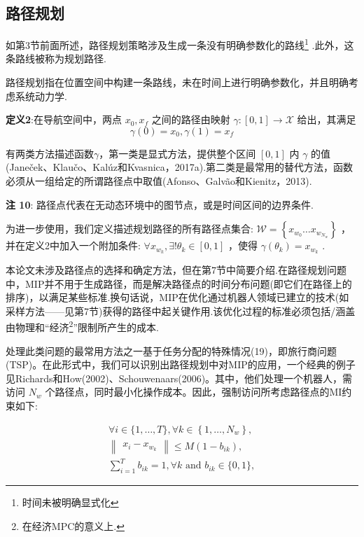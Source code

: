 \documentclass[10pt]{article}
\begin{document}
\subsection{路径规划}

如第3节前面所述，路径规划策略涉及生成一条没有明确参数化的路线\footnote{时间未被明确显式化} .此外，这条路线被称为规划路径.

路径规划指在位置空间中构建一条路线，未在时间上进行明确参数化，并且明确考虑系统动力学.

\vspace{1 em}
\noindent\textbf{定义2}:在导航空间中，两点 \({x}_{0},{x}_{f}\) 之间的路径由映射 \(\gamma  : \left\lbrack  {0,1}\right\rbrack   \rightarrow  \mathcal{X}\) 给出，其满足
\begin{equation}
\gamma \left( 0\right)  = {x}_{0},\gamma \left( 1\right)  = {x}_{f}
\end{equation}

有两类方法描述函数$\gamma$，第一类是显式方法，提供整个区间 \(\left\lbrack  {0,1}\right\rbrack\) 内 \(\gamma\) 的值(Janeček、Klaučo、Kalúz和Kvasnica，2017a).第二类是最常用的替代方法，函数必须从一组给定的所谓路径点中取值(Afonso、Galvão和Kienitz，2013).

\vspace{1 em}
\noindent\textbf{注 10}: 路径点代表在无动态环境中的图节点，或是时间区间的边界条件.
\vspace{1 em}

为进一步使用，我们定义描述规划路径的所有路径点集合: \(\mathcal{W} = \left\{  {{x}_{{w}_{0}}\ldots {x}_{{w}_{{N}_{w}}}}\right\}\) ，并在定义2中加入一个附加条件: \(\forall {x}_{{w}_{k}},\exists !{\theta }_{k} \in  \left\lbrack  {0,1}\right\rbrack\) ，使得 \(\gamma \left( {\theta }_{k}\right)  = {x}_{{w}_{k}}\) .

本论文未涉及路径点的选择和确定方法，但在第7节中简要介绍.在路径规划问题中，MIP并不用于生成路径，而是解决路径点的时间分布问题(即它们在路径上的排序)，以满足某些标准.换句话说，MIP在优化通过机器人领域已建立的技术(如采样方法——见第7节)获得的路径中起关键作用.该优化过程的标准必须包括/涵盖由物理和“经济\footnote{在经济MPC的意义上.}”限制所产生的成本.

处理此类问题的最常用方法之一基于任务分配的特殊情况(19)，即旅行商问题(TSP)。在此形式中，我们可以识别出路径规划中对MIP的应用，一个经典的例子见Richards和How(2002)、Schouwenaars(2006)。其中，他们处理一个机器人，需访问 \({N}_{w}\) 个路径点，同时最小化操作成本。因此，强制访问所考虑路径点的MI约束如下:

\begin{subequations}
\begin{gather}
\forall i \in  \{ 1,\ldots ,T\} ,\forall k \in  \left\{  {1,\ldots ,{N}_{w}}\right\}  , \\
\begin{Vmatrix}{{x}_{i} - {x}_{{w}_{k}}}\end{Vmatrix} \leq  M\left( {1 - {b}_{ik}}\right) , \\
\mathop{\sum }\limits_{{i = 1}}^{T}{b}_{ik} = 1,\forall k\text{ and }{b}_{ik} \in  \{ 0,1\} ,
\end{gather}
\end{subequations}
\end{document}
